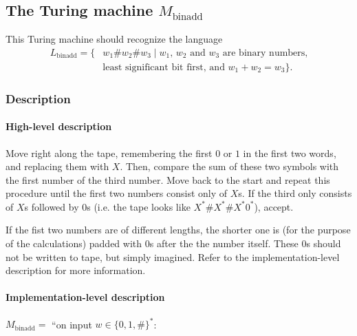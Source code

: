 \subsection{The Turing machine $M_\text{binadd}$}

This Turing machine should recognize the language
\begin{align*}
    L_\text{binadd} = \{& w_1 \# w_2 \# w_3 \mid \text{$w_1$, $w_2$ and $w_3$ are binary numbers,} \\
    &\text{least significant bit first, and $w_1+w_2=w_3$} \}.
\end{align*}


\subsubsection{Description}

\paragraph{High-level description}
Move right along the tape, remembering the first $0$ or $1$ in the first two words, and replacing them with $X$. Then, compare the sum of these two symbols with the first number of the third number. Move back to the start and repeat this procedure until the first two numbers consist only of $X$s. If the third only consists of $X$s followed by $0$s (i.e. the tape looks like $X^*\#X^*\#X^*0^*$), accept.

If the fist two numbers are of different lengths, the shorter one is (for the purpose of the calculations) padded with $0$s after the the number itself. These $0$s should not be written to tape, but simply imagined. Refer to the implementation-level description for more information. 

\paragraph{Implementation-level description}
$M_{\text{binadd}}=$
``on input $w \in \{0,1,\#\}^*$:

